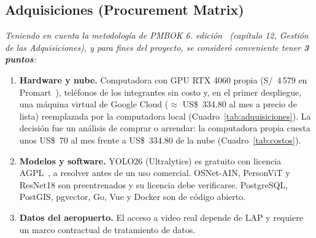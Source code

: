 \documentclass[12pt,a4paper]{article}
\begin{document}
\subsection{Adquisiciones (Procurement Matrix)}
\label{sec:adquisiciones}

\textit{Teniendo en cuenta la metodología de PMBOK 6.\textordfeminine{} edición~\cite{pmbok6}
(capítulo 12, Gestión de las Adquisiciones), y para fines del proyecto, se
consideró conveniente tener \textbf{3 puntos}:}

\begin{enumerate}
    \item \textbf{Hardware y nube.} Computadora con GPU RTX 4060 propia
    (S/~4\,579 en Promart~\cite{promart-pc}), teléfonos de los integrantes sin costo
    y, en el primer despliegue, una máquina virtual de Google Cloud
    ($\approx$ US\$~334.80 al mes a precio de lista) reemplazada por la
    computadora local (Cuadro~\ref{tab:adquisiciones}). La decisión fue un análisis de comprar o arrendar: la
    computadora propia cuesta unos US\$~70 al mes frente a US\$~334.80 de la
    nube (Cuadro~\ref{tab:costos}).

    \item \textbf{Modelos y software.} YOLO26 (Ultralytics) es gratuito con
    licencia AGPL~\cite{ultralytics-licencia}, a resolver antes de un uso comercial. OSNet-AIN, PersonViT y ResNet18 son preentrenados y su licencia debe verificarse.
    PostgreSQL, PostGIS, pgvector, Go, Vue y Docker son
    de código abierto.

    \item \textbf{Datos del aeropuerto.} El acceso a video real depende de LAP
    y requiere un marco contractual de tratamiento de datos.
\end{enumerate}
\end{document}
